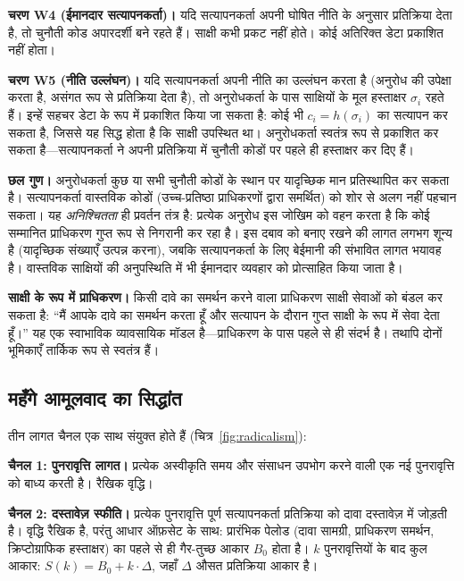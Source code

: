 \documentclass[11pt,a4paper,twocolumn]{article}
\begin{document}
\textbf{चरण W4 (ईमानदार सत्यापनकर्ता)।} यदि सत्यापनकर्ता अपनी घोषित नीति के अनुसार प्रतिक्रिया देता है, तो चुनौती कोड अपारदर्शी बने रहते हैं। साक्षी कभी प्रकट नहीं होते। कोई अतिरिक्त डेटा प्रकाशित नहीं होता।

\textbf{चरण W5 (नीति उल्लंघन)।} यदि सत्यापनकर्ता अपनी नीति का उल्लंघन करता है (अनुरोध की उपेक्षा करता है, असंगत रूप से प्रतिक्रिया देता है), तो अनुरोधकर्ता के पास साक्षियों के मूल हस्ताक्षर $\sigma_i$ रहते हैं। इन्हें सहचर डेटा के रूप में प्रकाशित किया जा सकता है: कोई भी $c_i = h(\sigma_i)$ का सत्यापन कर सकता है, जिससे यह सिद्ध होता है कि साक्षी उपस्थित था। अनुरोधकर्ता स्वतंत्र रूप से प्रकाशित कर सकता है---सत्यापनकर्ता ने अपनी प्रतिक्रिया में चुनौती कोडों पर पहले ही हस्ताक्षर कर दिए हैं।

\textbf{छल गुण।} अनुरोधकर्ता कुछ या सभी चुनौती कोडों के स्थान पर यादृच्छिक मान प्रतिस्थापित कर सकता है। सत्यापनकर्ता वास्तविक कोडों (उच्च-प्रतिष्ठा प्राधिकरणों द्वारा समर्थित) को शोर से अलग नहीं पहचान सकता। यह \emph{अनिश्चितता} ही प्रवर्तन तंत्र है: प्रत्येक अनुरोध इस जोखिम को वहन करता है कि कोई सम्मानित प्राधिकरण गुप्त रूप से निगरानी कर रहा है। इस दबाव को बनाए रखने की लागत लगभग शून्य है (यादृच्छिक संख्याएँ उत्पन्न करना), जबकि सत्यापनकर्ता के लिए बेईमानी की संभावित लागत भयावह है। वास्तविक साक्षियों की अनुपस्थिति में भी ईमानदार व्यवहार को प्रोत्साहित किया जाता है।

\textbf{साक्षी के रूप में प्राधिकरण।} किसी दावे का समर्थन करने वाला प्राधिकरण साक्षी सेवाओं को बंडल कर सकता है: ``मैं आपके दावे का समर्थन करता हूँ और सत्यापन के दौरान गुप्त साक्षी के रूप में सेवा देता हूँ।'' यह एक स्वाभाविक व्यावसायिक मॉडल है---प्राधिकरण के पास पहले से ही संदर्भ है। तथापि दोनों भूमिकाएँ तार्किक रूप से स्वतंत्र हैं।

\subsection{महँगे आमूलवाद का सिद्धांत}

तीन लागत चैनल एक साथ संयुक्त होते हैं (चित्र~\ref{fig:radicalism}):

\textbf{चैनल 1: पुनरावृत्ति लागत।} प्रत्येक अस्वीकृति समय और संसाधन उपभोग करने वाली एक नई पुनरावृत्ति को बाध्य करती है। रैखिक वृद्धि।

\textbf{चैनल 2: दस्तावेज़ स्फीति।} प्रत्येक पुनरावृत्ति पूर्ण सत्यापनकर्ता प्रतिक्रिया को दावा दस्तावेज़ में जोड़ती है। वृद्धि रैखिक है, परंतु आधार ऑफ़सेट के साथ: प्रारंभिक पेलोड (दावा सामग्री, प्राधिकरण समर्थन, क्रिप्टोग्राफिक हस्ताक्षर) का पहले से ही गैर-तुच्छ आकार $B_0$ होता है। $k$ पुनरावृत्तियों के बाद कुल आकार: $S(k) = B_0 + k \cdot \Delta$, जहाँ $\Delta$ औसत प्रतिक्रिया आकार है।
\end{document}
